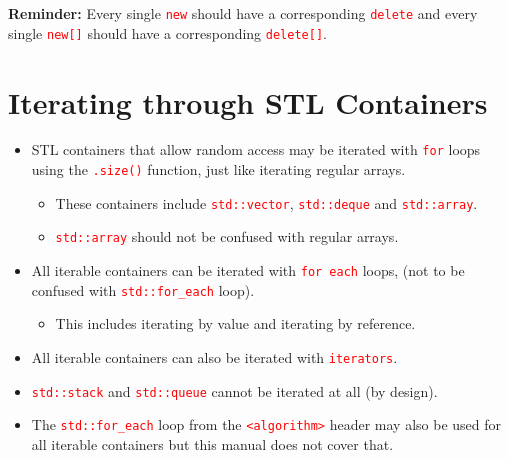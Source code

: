 \documentclass[12pt]{article}
\begin{document}
\noindent \textbf{Reminder:} Every single \textcolor{red}{\texttt{new}} should have a corresponding \textcolor{red}{\texttt{delete}} and every single \textcolor{red}{\texttt{new[]}} should 
have a corresponding \textcolor{red}{\texttt{delete[]}}. \\

\newpage
{}
\section*{Iterating through STL Containers}

\begin{itemize}
    \item STL containers that allow random access may be iterated with \textcolor{red}{\texttt{for}} loops using the \textcolor{red}{\texttt{.size()}} function, just like iterating regular arrays.
        
    \begin{itemize}
        \item These containers include \textcolor{red}{\texttt{std::vector}}, \textcolor{red}{\texttt{std::deque}} and \textcolor{red}{\texttt{std::array}}. 
        \item \textcolor{red}{\texttt{std::array}} should not be confused with regular arrays.
    \end{itemize}

    \item All iterable containers can be iterated with \textcolor{red}{\texttt{for each}} loops, (not to be confused with \textcolor{red}{\texttt{std::for\_each}} loop).
    
    \begin{itemize}
        \item This includes iterating by value and iterating by reference.
    \end{itemize}

    \item All iterable containers can also be iterated with \textcolor{red}{\texttt{iterators}}.

    \item \textcolor{red}{\texttt{std::stack}} and \textcolor{red}{\texttt{std::queue}} cannot be iterated at all (by design).

    \item The \textcolor{red}{\texttt{std::for\_each}} loop from the \textcolor{red}{\texttt{<algorithm>}} header may also be used for all iterable containers but this manual does not cover that.

\end{itemize}
\end{document}
